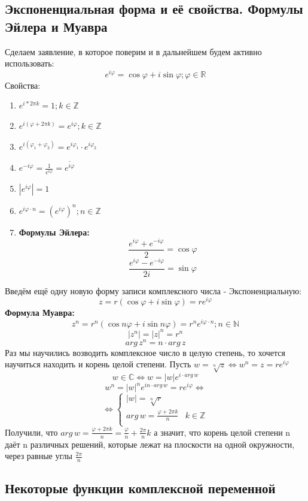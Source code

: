 \documentclass[twoside]{book}
\begin{document}
\subsection{Экспоненциальная форма и её свойства. Формулы Эйлера и Муавра}

Сделаем заявление, в которое поверим и в дальнейшем будем активно использовать:
$$e^{i\varphi}=\cos{\varphi} + i\sin{\varphi}; \varphi\in\mathbb{R}$$
Свойства:
\begin{enumerate}
    \item $e^{i*2\pi k} = 1; k\in\mathbb{Z}$
    \item $e^{i(\varphi + 2\pi k)} = e^{i\varphi}; k\in\mathbb{Z}$
    \item $e^{i(\varphi_1 + \varphi_2)} = e^{i\varphi_1} \cdot e^{i\varphi_2}$
    \item $e^{-i\varphi} = \frac{1}{e^{i\varphi}} = \overline{e^{i\varphi}}$
    \item $|e^{i\varphi}| = 1$
    \item $e^{i\varphi \cdot n} = (e^{i\varphi})^n; n\in\mathbb{Z}$
    \item \textbf{Формулы Эйлера:}
          $$\frac{e^{i\varphi}+e^{-i\varphi}}{2}=\cos{\varphi}$$
          $$\frac{e^{i\varphi}-e^{-i\varphi}}{2i}=\sin{\varphi}$$
\end{enumerate}

Введём ещё одну новую форму записи комплексного числа - Экспоненциальную:
$$z=r(\cos{\varphi}+i\sin{\varphi})=re^{i\varphi}$$
\textbf{Формула Муавра:}
$$z^n=r^n(\cos{n\varphi} + i\sin{n\varphi})=r^ne^{i\varphi \cdot n}; n\in\mathbb{N}$$
$$|z^n|=|z|^n=r^n$$
$$arg\,z^n=n \cdot arg\,z$$
Раз мы научились возводить комплексное число в целую степень, то хочется научиться находить и корень целой степени. Пусть $w=\sqrt[n]{z} \Leftrightarrow w^n=z=re^{i\varphi}$
$$w\in\mathbb{C}\Leftrightarrow w=|w|e^{i \cdot arg\,w}$$
$$w^n=|w|^ne^{in \cdot arg\,w}=re^{i\varphi} \Leftrightarrow$$
$$\Leftrightarrow
    \begin{cases}
        |w|=\sqrt[n]{r}                                  \\
        arg\,w=\frac{\varphi+2\pi k}{n} & k\in\mathbb{Z} \\
    \end{cases}
$$
Получили, что $arg\,w=\frac{\varphi+2\pi k}{n}=\frac{\varphi}{n} + \frac{2\pi}{n}k$ а значит, что корень целой степени n даёт n различных решений, которые лежат на плоскости на одной окружности, через равные углы $\frac{2\pi}{n}$

\subsection{Некоторые функции комплексной переменной}
\end{document}
